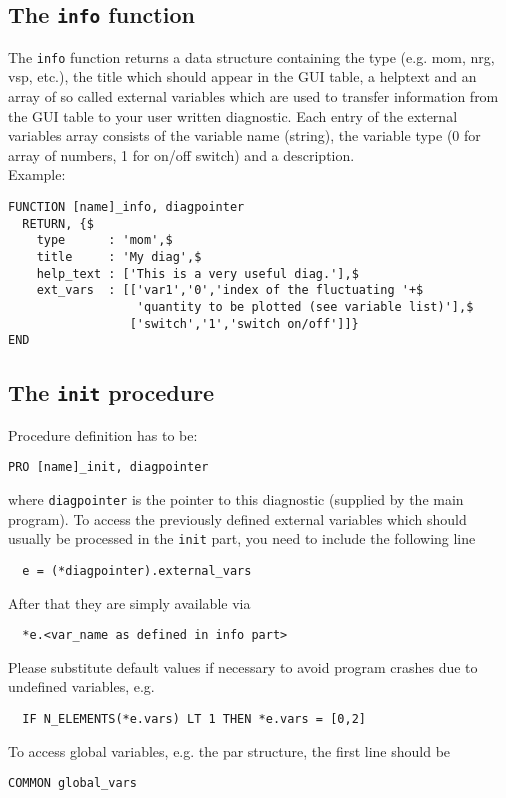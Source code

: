 \documentclass[12pt]{article}
\begin{document}
\subsection{The \texttt{info} function}

The \texttt{info} function returns a data structure containing the type (e.g. 
mom, nrg, vsp, etc.), the title which should appear in the GUI 
table, a helptext and an array of so called external variables 
which are used to transfer information from the GUI table to your
user written diagnostic. Each entry of the external variables array 
consists of the variable name (string), the variable type (0 for 
array of numbers, 1 for on/off switch) and a description.\\
Example:
\begin{verbatim}
FUNCTION [name]_info, diagpointer
  RETURN, {$
    type      : 'mom',$
    title     : 'My diag',$
    help_text : ['This is a very useful diag.'],$
    ext_vars  : [['var1','0','index of the fluctuating '+$
                  'quantity to be plotted (see variable list)'],$
                 ['switch','1','switch on/off']]}
END
\end{verbatim}

\subsection{The \texttt{init} procedure}

Procedure definition has to be:
\begin{verbatim}
PRO [name]_init, diagpointer
\end{verbatim}
where \texttt{diagpointer} is the pointer to this diagnostic
(supplied by the main program). To access the previously defined
external variables which should usually be processed in the \texttt{init} 
part, you need to include the following line 
\begin{verbatim} 
  e = (*diagpointer).external_vars
\end{verbatim}
After that they are simply available via
\begin{verbatim} 
  *e.<var_name as defined in info part>  
\end{verbatim}
Please substitute default values if necessary to avoid program crashes
due to undefined variables, e.g.
\begin{verbatim} 
  IF N_ELEMENTS(*e.vars) LT 1 THEN *e.vars = [0,2]
\end{verbatim}

To access global variables, e.g. the par structure, the first line should
be
\begin{verbatim}
COMMON global_vars
\end{verbatim}
\end{document}
